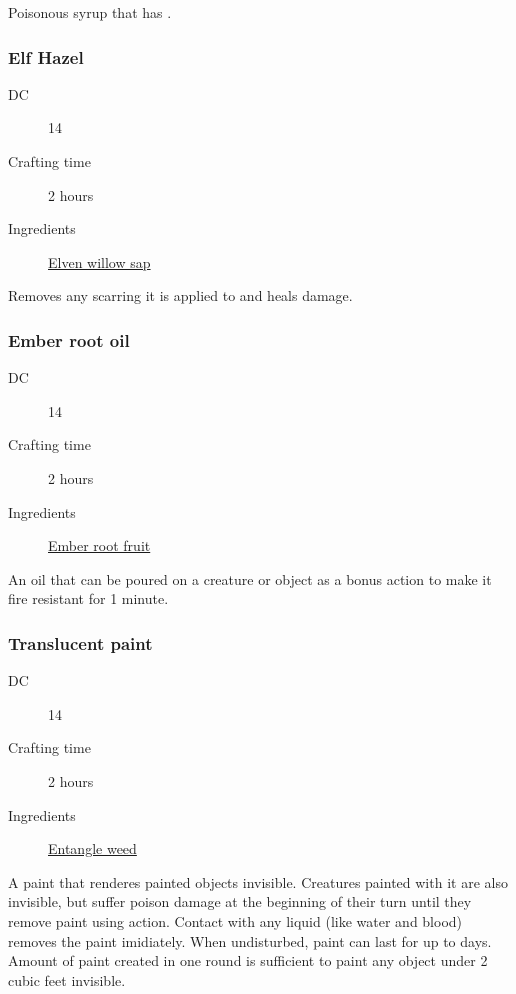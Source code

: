 Poisonous syrup that has \poison\poison\poison.

\subsubsection{Elf Hazel}
\label{Elf Hazel}

\begin{description}
\item [DC] 14
\item [Crafting time] 2 hours
\item [Ingredients] \hyperref[Elven Willow]{Elven willow sap}
\end{description}

Removes any scarring it is applied to and heals  damage.

\subsubsection{Ember root oil}
\label{Ember root oil}

\begin{description}
\item [DC] 14
\item [Crafting time] 2 hours
\item [Ingredients] \hyperref[Ember root]{Ember root fruit}
\end{description}

An oil that can be poured on a creature or object as a bonus action to make it fire resistant for 1 minute.

\subsubsection{Translucent paint}
\label{Translucent paint}

\begin{description}
\item [DC] 14
\item [Crafting time] 2 hours
\item [Ingredients] \hyperref[Entangle Weed]{Entangle weed}
\end{description}

A paint that renderes painted objects invisible. Creatures painted with it are also invisible, 
but suffer  poison damage at the beginning of their turn until they remove paint using action. 
Contact with any liquid (like water and blood) removes the paint imidiately. 
When undisturbed, paint can last for up to  days. 
Amount of paint created in one round is sufficient to paint any object under 2 cubic feet invisible.

